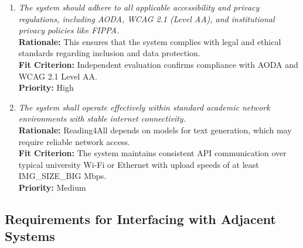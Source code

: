 \documentclass[12pt]{article}
\begin{document}
\begin{enumerate}[label=OER-WE\arabic*., wide=0pt, leftmargin=*]
  \item \emph{The system should adhere to all applicable accessibility and privacy regulations, including AODA, WCAG 2.1 (Level AA), and institutional privacy policies like FIPPA.}\\[2mm]
    {\bf Rationale:} This ensures that the system complies with legal and ethical standards regarding inclusion and data protection.\\
    {\bf Fit Criterion:} Independent evaluation confirms compliance with AODA and WCAG 2.1 Level AA.\\
    {\bf Priority:} High

  \item \emph{The system shall operate effectively within standard
    academic network environments with stable internet connectivity.}\\[2mm]
    {\bf Rationale:} Reading4All depends on
    models for text generation, which may require reliable network access.\\
    {\bf Fit Criterion:} The system maintains consistent API
    communication over typical university Wi-Fi or Ethernet with
    upload speeds of at least IMG\_SIZE\_BIG Mbps.\\
    {\bf Priority:} Medium
\end{enumerate}
 
\subsection{Requirements for Interfacing with Adjacent Systems}
\end{document}
